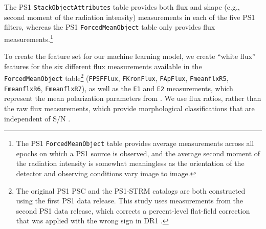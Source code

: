 \documentclass[twocolumn]{aastex63}
\begin{document}
The PS1 \texttt{StackObjectAttributes} table provides both flux and shape
(e.g., second moment of the radiation intensity) measurements in each of the
five PS1 filters, whereas the PS1 \texttt{ForcedMeanObject} table only
provides flux measurements.\footnote{The PS1 \texttt{ForcedMeanObject} table
provides average measurements across all epochs on which a PS1 source is
observed, and the average second moment of the radiation intensity is somewhat
meaningless as the orientation of the detector and observing conditions vary
image to image.}

To create the feature set for our machine learning model, we create ``white
flux'' features for the six different flux measurements available in the
\texttt{ForcedMeanObject} table\footnote{The original PS1 PSC and the PS1-STRM
catalogs are both constructed using the first PS1 data release. This study
uses measurements from the second PS1 data release, which corrects a
percent-level flat-field correction that was applied with the wrong sign in
DR1 \citep{Beck20}.} (\texttt{FPSFFlux}, \texttt{FKronFlux}, \texttt{FApFlux},
\texttt{FmeanflxR5}, \texttt{FmeanflxR6}, \texttt{FmeanflxR7}), as well as the
\texttt{E1} and \texttt{E2} measurements, which represent the mean
polarization parameters from \citet{Kaiser95}. We use flux ratios, rather than
the raw flux measurements, which provide morphological classifications that
are independent of S/N \citep{Lupton01}.
\end{document}
